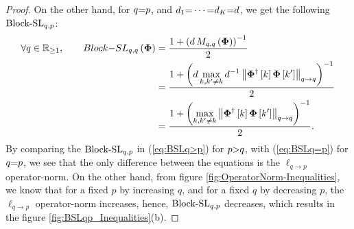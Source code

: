 \begin{proof}
On the other hand, for $q {=} p$, and $d_1 {=} \cdots {=} d_K {=} d$, we get the following $\mathrm{Block\text{{-}}SL}_{q,p}$:
\begin{gather}
\label{eq:BSLq=p}
\begin{aligned}
\forall q \in \mathbb{R}_{\geq 1}, \qquad
Block{-}SL_{q,q}\left( \boldsymbol{\Phi} \right) &= \frac{1 + \left( d \, M_{q,q}\left( \boldsymbol{\Phi} \right)  \right)^{-1}}{2} \\
&= \frac{1 + \left( d \displaystyle\max_{k,k' \neq k} d^{-1} \left\lVert\boldsymbol{\Phi}^\dagger\left[ k \right] \boldsymbol{\Phi} \left[ k' \right]\right\rVert_{q \to q} \right)^{-1} }{2} \\
&= \frac{1 + \left( \displaystyle\max_{k,k' \neq k} \left\lVert\boldsymbol{\Phi}^\dagger\left[ k \right] \boldsymbol{\Phi} \left[ k' \right]\right\rVert_{q \to q} \right)^{-1} }{2}.
\end{aligned}
\end{gather}
By comparing the $\mathrm{Block\text{{-}}SL}_{q,p}$ in (\ref{eq:BSLq>p}) for $p {>} q$, with (\ref{eq:BSLq=p}) for $q {=} p$, we see that the only difference between the equations is the $\ell_{q {\to} p}$ operator-norm.
On the other hand, from figure \ref{fig:OperatorNorm-Inequalities}, we know that for a fixed $p$ by increasing $q$, and for a fixed $q$ by decreasing $p$, the $\ell_{q {\to} p}$ operator-norm increases, hence, $\mathrm{Block\text{{-}}SL}_{q,p}$ decreases, which results in the figure \ref{fig:BSLqp_Inequalities}(b).
\end{proof}